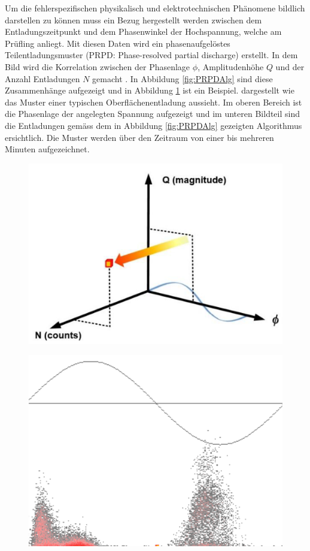 \begin{refsection}
Um die fehlerspezifischen physikalisch und elektrotechnischen Phänomene bildlich darstellen zu können muss ein Bezug hergestellt werden zwischen dem Entladungszeitpunkt und dem Phasenwinkel der Hochspannung, welche am Prüfling anliegt. 
Mit diesen Daten wird ein phasenaufgelöstes Teilentladungsmuster (PRPD: Phase-resolved partial discharge) erstellt. 
In dem Bild wird die Korrelation zwischen der Phasenlage $\phi$, Amplitudenhöhe $Q$ und der Anzahl Entladungen $N$ gemacht \cite{buch:UHFSignale}. 
In Abbildung \ref{fig:PRPDAlg} sind diese Zusammenhänge aufgezeigt und in Abbildung \ref{fig:PRPDHohl} 
ist ein Beispiel. dargestellt wie das Muster einer typischen Oberflächenentladung aussieht. 
Im oberen Bereich ist die Phasenlage der angelegten Spannung aufgezeigt und im unteren Bildteil sind die Entladungen gemäss dem in Abbildung \ref{fig:PRPDAlg} gezeigten Algorithmus ersichtlich.
Die Muster werden über den Zeitraum von einer bis mehreren Minuten aufgezeichnet.
\begin{figure}
	\centering
	\begin{minipage}{.5\textwidth}
		\centering
		\includegraphics[width=.9\linewidth]{papers/gis/Bilder/PERP}
		\label{fig:PRPDAlg}
	\end{minipage}%
	\begin{minipage}{.5\textwidth}
		\centering
		\includegraphics[width=.8\linewidth]{papers/gis/Bilder/OberflaechenentladungPRPD}
		\label{fig:PRPDHohl}
	\end{minipage}
\end{figure}



\end{refsection}

